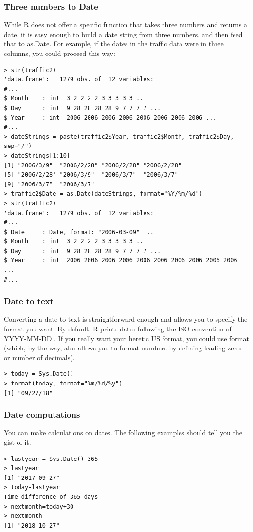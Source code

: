 \documentclass{report}
\newcommand{\code}[1]{\textsf{\ttfamily #1}}
\begin{document}
			\subsubsection{Three numbers to \code{Date}}
			While R does not offer a specific function that takes three numbers and returns a date, it is easy enough to build a date string from three numbers, and then feed that to \code{as.Date}. For example, if the dates in the traffic data were in three columns, you could proceed this way:
			
			\begin{verbatim}
> str(traffic2)
'data.frame':   1279 obs. of  12 variables:
#...
$ Month    : int  3 2 2 2 2 3 3 3 3 3 ...
$ Day      : int  9 28 28 28 28 9 7 7 7 7 ...
$ Year     : int  2006 2006 2006 2006 2006 2006 2006 2006 ...
#...
> dateStrings = paste(traffic2$Year, traffic2$Month, traffic2$Day, sep="/")
> dateStrings[1:10]
[1] "2006/3/9"  "2006/2/28" "2006/2/28" "2006/2/28"
[5] "2006/2/28" "2006/3/9"  "2006/3/7"  "2006/3/7" 
[9] "2006/3/7"  "2006/3/7" 
> traffic2$Date = as.Date(dateStrings, format="%Y/%m/%d")
> str(traffic2)
'data.frame':   1279 obs. of  12 variables:
#...
$ Date     : Date, format: "2006-03-09" ...
$ Month    : int  3 2 2 2 2 3 3 3 3 3 ...
$ Day      : int  9 28 28 28 28 9 7 7 7 7 ...
$ Year     : int  2006 2006 2006 2006 2006 2006 2006 2006 2006 2006 ...
#...
			\end{verbatim}
			
			\subsubsection{\code{Date} to text}
			Converting a date to text is straightforward enough and allows you to specify the format you want. By default, R prints dates following the ISO convention of YYYY-MM-DD \cite{calendar}. If you really want your heretic US format, you could use \code{format} (which, by the way, also allows you to format numbers by defining leading zeros or number of decimals).
			\begin{verbatim}
> today = Sys.Date()
> format(today, format="%m/%d/%y")
[1] "09/27/18"
			\end{verbatim}
			
			\subsubsection{\code{Date} computations}
			You can make calculations on dates. The following examples should tell you the gist of it.
			\begin{verbatim}
> lastyear = Sys.Date()-365
> lastyear
[1] "2017-09-27"
> today-lastyear
Time difference of 365 days
> nextmonth=today+30
> nextmonth
[1] "2018-10-27"
			\end{verbatim}
	
\end{document}
